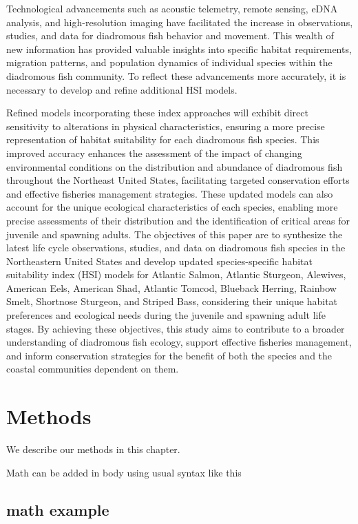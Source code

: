 \documentclass[
]{book}
\begin{document}
Technological advancements such as acoustic telemetry, remote sensing, eDNA analysis, and high-resolution imaging have facilitated the increase in observations, studies, and data for diadromous fish behavior and movement. This wealth of new information has provided valuable insights into specific habitat requirements, migration patterns, and population dynamics of individual species within the diadromous fish community. To reflect these advancements more accurately, it is necessary to develop and refine additional HSI models.

Refined models incorporating these index approaches will exhibit direct sensitivity to alterations in physical characteristics, ensuring a more precise representation of habitat suitability for each diadromous fish species. This improved accuracy enhances the assessment of the impact of changing environmental conditions on the distribution and abundance of diadromous fish throughout the Northeast United States, facilitating targeted conservation efforts and effective fisheries management strategies. These updated models can also account for the unique ecological characteristics of each species, enabling more precise assessments of their distribution and the identification of critical areas for juvenile and spawning adults. The objectives of this paper are to synthesize the latest life cycle observations, studies, and data on diadromous fish species in the Northeastern United States and develop updated species-specific habitat suitability index (HSI) models for Atlantic Salmon, Atlantic Sturgeon, Alewives, American Eels, American Shad, Atlantic Tomcod, Blueback Herring, Rainbow Smelt, Shortnose Sturgeon, and Striped Bass, considering their unique habitat preferences and ecological needs during the juvenile and spawning adult life stages. By achieving these objectives, this study aims to contribute to a broader understanding of diadromous fish ecology, support effective fisheries management, and inform conservation strategies for the benefit of both the species and the coastal communities dependent on them.

\hypertarget{methods}{%
\chapter{Methods}\label{methods}}

We describe our methods in this chapter.

Math can be added in body using usual syntax like this

\hypertarget{math-example}{%
\section{math example}\label{math-example}}
\end{document}
